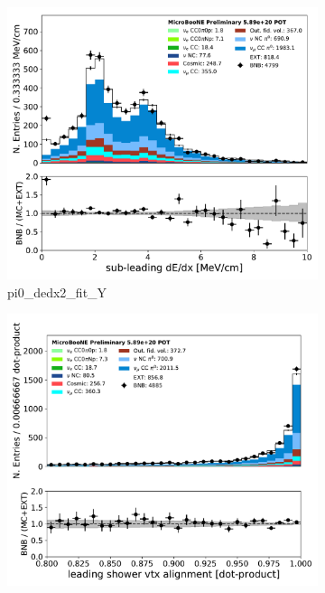 \begin{figure}[H] 
\begin{center}
    \begin{subfigure}[b]{0.3\textwidth}
    \centering
    \includegraphics[width=1.00\textwidth]{pi0/inputs/pi0_dedx2_fit_Y_03182020_presel.pdf}
    \caption{\label{fig:pi0:inputs:dedx2:RUN1} pi0\_dedx2\_fit\_Y}
    \end{subfigure}
    \begin{subfigure}[b]{0.3\textwidth}
    \centering
    \includegraphics[width=1.00\textwidth]{pi0/inputs/pi0_dot1_03182020_presel.pdf}

\end{subfigure}
\end{center}
\end{figure}
